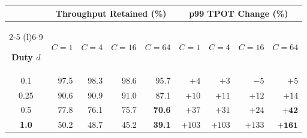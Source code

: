 
\begingroup
\renewcommand{\arraystretch}{1.20}
\setlength{\tabcolsep}{3.5pt}

\begin{tabular}{@{}crrrrrrrr@{}}
\toprule

&
\multicolumn{4}{c}{
  \textbf{Throughput Retained (\%)}
}
&
\multicolumn{4}{c}{
  \textbf{p99 TPOT Change (\%)}
} \\

\cmidrule(lr){2-5}
\cmidrule(l){6-9}

\textbf{Duty $d$}
& \textbf{$C{=}1$}
& \textbf{$C{=}4$}
& \textbf{$C{=}16$}
& \textbf{$C{=}64$}
& \textbf{$C{=}1$}
& \textbf{$C{=}4$}
& \textbf{$C{=}16$}
& \textbf{$C{=}64$} \\

\midrule

0.1
& 97.5 & 98.3 & 98.6 & 95.7
& $+4$ & $+3$ & $-5$ & $+5$ \\

0.25
& 90.6 & 90.9 & 91.0 & 87.1
& $+10$ & $+11$ & $+12$ & $+14$ \\

\addlinespace[3pt]

0.5
& 77.8
& 76.1
& 75.7
& \cellcolor{tabHighlight}\textbf{70.6}
& $+37$
& $+31$
& $+24$
& \cellcolor{tabHighlight}$\boldsymbol{+42}$ \\

\rowcolor{tabGroup}
\textbf{1.0}
& 50.2
& 48.7
& 45.2
& \cellcolor{tabDrop}\textbf{39.1}
& $+103$
& $+103$
& $+133$
& \cellcolor{tabDrop}$\boldsymbol{+161}$ \\

\bottomrule
\end{tabular}
\endgroup
